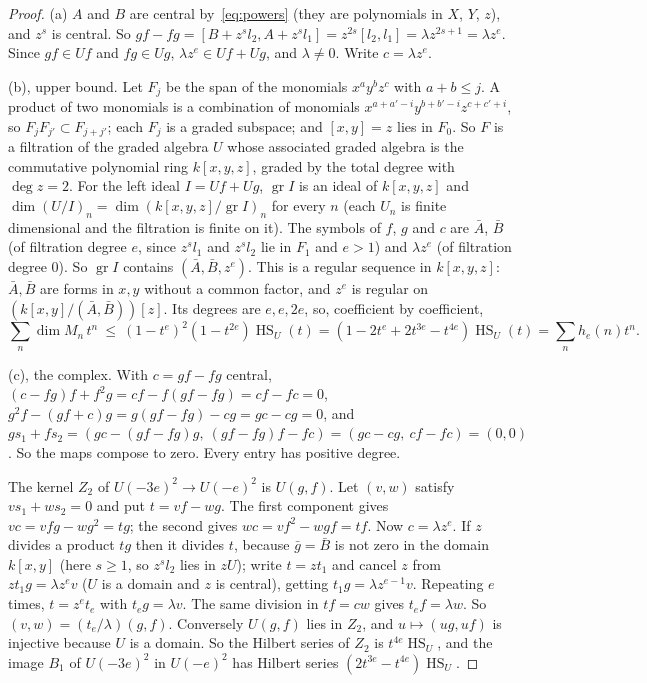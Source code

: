 \documentclass[11pt]{article}
\theoremstyle{definition}
\theoremstyle{remark}
\newcommand{\Hilb}{\operatorname{HS}}
\begin{document}
\begin{proof}
(a) $A$ and $B$ are central by~\eqref{eq:powers} (they are polynomials in $X$, $Y$, $z$), and $z^s$ is central. So $gf-fg=[B+z^sl_2,A+z^sl_1]=z^{2s}[l_2,l_1]=\lambda z^{2s+1}=\lambda z^e$. Since $gf\in Uf$ and $fg\in Ug$, $\lambda z^e\in Uf+Ug$, and $\lambda\ne0$. Write $c=\lambda z^e$.

(b), upper bound. Let $F_j$ be the span of the monomials $x^ay^bz^c$ with $a+b\le j$. A product of two monomials is a combination of monomials $x^{a+a'-i}y^{b+b'-i}z^{c+c'+i}$, so $F_jF_{j'}\subset F_{j+j'}$; each $F_j$ is a graded subspace; and $[x,y]=z$ lies in $F_0$. So $F$ is a filtration of the graded algebra $U$ whose associated graded algebra is the commutative polynomial ring $k[x,y,z]$, graded by the total degree with $\deg z=2$. For the left ideal $I=Uf+Ug$, $\operatorname{gr}I$ is an ideal of $k[x,y,z]$ and $\dim(U/I)_n=\dim(k[x,y,z]/\operatorname{gr}I)_n$ for every $n$ (each $U_n$ is finite dimensional and the filtration is finite on it). The symbols of $f$, $g$ and $c$ are $\bar A$, $\bar B$ (of filtration degree $e$, since $z^sl_1$ and $z^sl_2$ lie in $F_1$ and $e>1$) and $\lambda z^e$ (of filtration degree $0$). So $\operatorname{gr}I$ contains $(\bar A,\bar B,z^e)$. This is a regular sequence in $k[x,y,z]$: $\bar A,\bar B$ are forms in $x,y$ without a common factor, and $z^e$ is regular on $(k[x,y]/(\bar A,\bar B))[z]$. Its degrees are $e,e,2e$, so, coefficient by coefficient,
\[
\sum_n\dim M_n\,t^n\ \le\ (1-t^e)^2(1-t^{2e})\Hilb_U(t)=(1-2t^e+2t^{3e}-t^{4e})\Hilb_U(t)=\sum_nh_e(n)t^n.
\]

(c), the complex. With $c=gf-fg$ central, $(c-fg)f+f^2g=cf-f(gf-fg)=cf-fc=0$, $g^2f-(gf+c)g=g(gf-fg)-cg=gc-cg=0$, and $gs_1+fs_2=(gc-(gf-fg)g,\ (gf-fg)f-fc)=(gc-cg,\ cf-fc)=(0,0)$. So the maps compose to zero. Every entry has positive degree.

The kernel $Z_2$ of $U(-3e)^2\to U(-e)^2$ is $U(g,f)$. Let $(v,w)$ satisfy $vs_1+ws_2=0$ and put $t=vf-wg$. The first component gives $vc=vfg-wg^2=tg$; the second gives $wc=vf^2-wgf=tf$. Now $c=\lambda z^e$. If $z$ divides a product $tg$ then it divides $t$, because $\bar g=\bar B$ is not zero in the domain $k[x,y]$ (here $s\ge1$, so $z^sl_2$ lies in $zU$); write $t=zt_1$ and cancel $z$ from $zt_1g=\lambda z^ev$ ($U$ is a domain and $z$ is central), getting $t_1g=\lambda z^{e-1}v$. Repeating $e$ times, $t=z^et_e$ with $t_eg=\lambda v$. The same division in $tf=cw$ gives $t_ef=\lambda w$. So $(v,w)=(t_e/\lambda)(g,f)$. Conversely $U(g,f)$ lies in $Z_2$, and $u\mapsto(ug,uf)$ is injective because $U$ is a domain. So the Hilbert series of $Z_2$ is $t^{4e}\Hilb_U$, and the image $B_1$ of $U(-3e)^2$ in $U(-e)^2$ has Hilbert series $(2t^{3e}-t^{4e})\Hilb_U$.


\end{proof}
\end{document}
